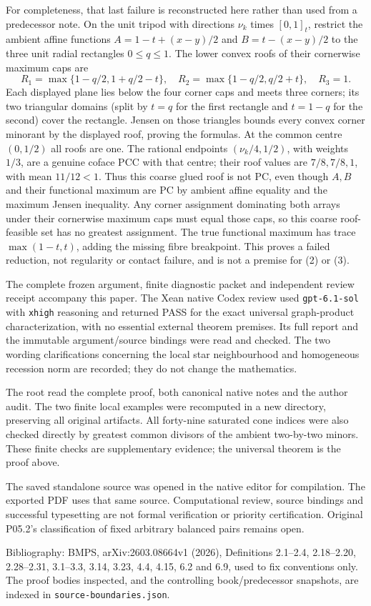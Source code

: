 \documentclass[
  11pt,
]{article}
\begin{document}
For completeness, that last failure is reconstructed here rather than
used from a predecessor note. On the unit tripod with directions
\(\nu_k\) times \([0,1]_t\), restrict the ambient affine functions
\(A=1-t+(x-y)/2\) and \(B=t-(x-y)/2\) to the three unit radial
rectangles \(0\leq q\leq1\). The lower convex roofs of their cornerwise
maximum caps are \[
 R_1=\max\{1-q/2,1+q/2-t\},\quad
 R_2=\max\{1-q/2,q/2+t\},\quad R_3=1.
\] Each displayed plane lies below the four corner caps and meets three
corners; its two triangular domains (split by \(t=q\) for the first
rectangle and \(t=1-q\) for the second) cover the rectangle. Jensen on
those triangles bounds every convex corner minorant by the displayed
roof, proving the formulas. At the common centre \((0,1/2)\) all roofs
are one. The rational endpoints \((\nu_k/4,1/2)\), with weights \(1/3\),
are a genuine coface PCC with that centre; their roof values are
\(7/8,7/8,1\), with mean \(11/12<1\). Thus this coarse glued roof is not
PC, even though \(A,B\) and their functional maximum are PC by ambient
affine equality and the maximum Jensen inequality. Any corner assignment
dominating both arrays under their cornerwise maximum caps must equal
those caps, so this coarse roof-feasible set has no greatest assignment.
The true functional maximum has trace \(\max(1-t,t)\), adding the
missing fibre breakpoint. This proves a failed reduction, not regularity
or contact failure, and is not a premise for (2) or (3).

The complete frozen argument, finite diagnostic packet and independent
review receipt accompany this paper. The Xean native Codex review used
\texttt{gpt-6.1-sol} with \texttt{xhigh} reasoning and returned PASS
for the exact universal graph-product characterization, with no essential
external theorem premises. Its full report and the immutable
argument/source bindings were read and checked. The two wording
clarifications concerning the local star neighbourhood and homogeneous
recession norm are recorded; they do not change the mathematics.

The root read the complete proof, both canonical native notes and the
author audit. The two finite local examples were recomputed in a new
directory, preserving all original artifacts. All forty-nine saturated
cone indices were also checked directly by greatest common divisors of
the ambient two-by-two minors. These finite checks are supplementary
evidence; the universal theorem is the proof above.

The saved standalone source was opened in the native editor for
compilation. The exported PDF uses that same source. Computational
review, source bindings and successful typesetting are not formal
verification or priority certification. Original P05.2's classification
of fixed arbitrary balanced pairs remains open.

Bibliography: BMPS, arXiv:2603.08664v1 (2026), Definitions 2.1--2.4,
2.18--2.20, 2.28--2.31, 3.1--3.3, 3.14, 3.23, 4.4, 4.15, 6.2 and 6.9,
used to fix conventions only. The proof bodies inspected, and the
controlling book/predecessor snapshots, are indexed in
\texttt{source-boundaries.json}.
\end{document}
